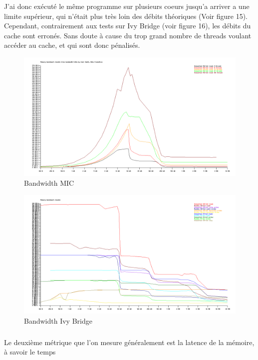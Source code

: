 \documentclass{article}
\begin{document}
					J'ai donc exécuté le même programme sur plusieurs coeurs jusqu'a arriver a une limite supérieur, qui 
					n'était plus très loin des débits théoriques (Voir figure 15). Cependant, contrairement aux tests sur 
					Ivy Bridge (voir figure 16), les débits du cache sont erronés. Sans doute à cause du trop grand nombre 
					de threads voulant accéder au cache, et qui sont donc pénalisés.
					\begin{figure}
					\begin{center}
					\includegraphics[scale=0.33]{bandwidth_MICO3.png}
					\caption{Bandwidth MIC}
					\end{center}
					\end{figure}
					\begin{figure}
					\begin{center}
					\includegraphics[scale=0.33]{bandwidth_IVYO3.png}
					\caption{Bandwidth Ivy Bridge}
					\end{center}
					\end{figure}
					\subparagraph{}
					Le deuxième métrique que l'on mesure généralement est la latence de la mémoire, à savoir le temps
\end{document}
